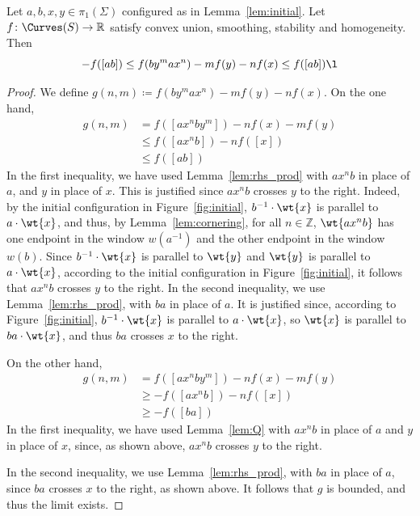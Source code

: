  \begin{proposition}
  Let $a, b, x, y \in \pi_1(\Sigma)$ configured as in Lemma~\ref{lem:initial}.
 Let $f \colon \Curves(S) \to \mathbb{R}$ satisfy convex union, smoothing, stability and homogeneity.
 Then
 \[
- f([ab]) \leq f(b y^m a x^n) - mf(y) - nf(x) \leq f([ab]) \l
\]
\label{prop:bounded_double}
 \end{proposition}
 \begin{proof}
 We define $g(n,m) \coloneqq f(b y^m a x^n) - mf(y) - nf(x)$. 
 On the one hand, 
 \begin{align*}
     g(n,m)&=f([ax^n by^m])-nf(x) - mf(y) \\
     &\leq f([ax^n b]) - n f([x]) \\
     &\leq f([ab])
 \end{align*}
 In the first inequality, we have used Lemma~\ref{lem:rhs_prod} with $ax^nb$ in place of $a$, and $y$ in place of $x$. This is justified since $ax^nb$ crosses $y$ to the right. Indeed, by the initial configuration in Figure~\ref{fig:initial}, $b^{-1} \cdot \wt{x}$ is parallel to $a \cdot \wt{x}$, and thus, by Lemma~\ref{lem:cornering}, for all $n \in \mathbb{Z}$, $\wt{ax^nb}$ has one endpoint in the window $w(a^{-1})$ and the other endpoint in the window $w(b)$. Since $b^{-1} \cdot \wt{x}$ is parallel to $\wt{y}$ and $\wt{y}$ is parallel to $a \cdot \wt{x}$, according to the initial configuration in Figure~\ref{fig:initial}, it follows that $ax^nb$ crosses $y$ to the right.
 In the second inequality, we use Lemma~\ref{lem:rhs_prod}, with $ba$ in place of $a$.  
 It is justified since, according to Figure~\ref{fig:initial}, $b^{-1}\cdot \wt{x}$ is parallel to $a \cdot \wt{x}$, so $\wt{x}$ is parallel to $ba \cdot \wt{x}$, and thus $ba$ crosses $x$ to the right.
 
 On the other hand, 
 \begin{align*}
     g(n,m)&=f([ax^n by^m])-nf(x) - mf(y) \\
     &\geq -f([ax^nb]) - n f([x]) \\
     &\geq -f([ba])
 \end{align*}
 In the first inequality, we have used Lemma~\ref{lem:Q} with $a x^n b$ in place of $a$ and $y$ in place of $x$, since, as shown above, $ax^nb$ crosses $y$ to the right.

 In the second inequality, we use Lemma~\ref{lem:rhs_prod}, with $ba$ in place of $a$, since $ba$ crosses $x$ to the right, as shown above.  
 It follows that $g$ is bounded, and thus the limit exists.
 \end{proof}


